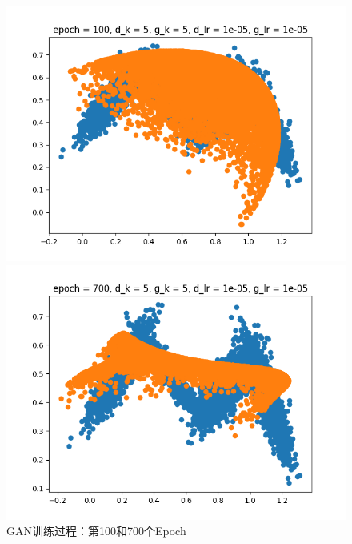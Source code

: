 \documentclass{article}
\begin{document}
\begin{figure}[H]
    \begin{minipage}[H]{0.5\linewidth}
        \centering
        \includegraphics[width=\textwidth]{figures/WGAN_0100.png}
    \end{minipage}
    \begin{minipage}[H]{0.5\linewidth}
        \centering
        \includegraphics[width=\textwidth]{figures/WGAN_0700.png}
    \end{minipage}
    \caption{GAN训练过程：第100和700个Epoch}
\end{figure}
\end{document}
